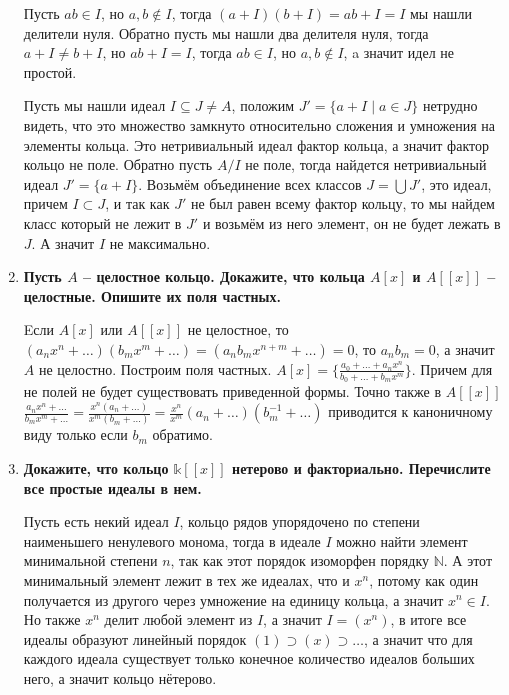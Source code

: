 \documentclass{article}
\begin{document}
\begin{enumerate}
        Пусть $ab\in I$, но $a,b\notin I$, тогда $(a+I)(b+I)=ab+I=I$ мы нашли
        делители нуля. Обратно пусть мы нашли два делителя нуля, тогда $a+I\neq
        b+I$, но $ab+I=I$, тогда $ab\in I$, но $a,b\notin I$, a значит идел не
        простой.

        Пусть мы нашли идеал $I\subseteq J\neq A$, положим $J'=\{a+I\;|\;a\in J\}$
        нетрудно видеть, что это множество замкнуто относительно сложения и
        умножения на элементы кольца. Это нетривиальный идеал фактор кольца, а
        значит фактор кольцо не поле. Обратно пусть $A/I$ не поле, тогда
        найдется нетривиальный идеал $J'=\{a+I\}$. Возьмём объединение всех
        классов $J=\bigcup J'$, это идеал, причем $I\subset J$, и так как $J'$
        не был равен всему фактор кольцу, то мы найдем класс который не лежит в
        $J'$ и возьмём из него элемент, он не будет лежать в $J$. А значит $I$
        не максимально.

    \item \textbf{Пусть $A$ – целостное кольцо. Докажите, что кольца $A[x]$ и
        $A[[x]]$ – целостные. Опишите их поля частных.}

    Eсли $A[x]$ или $A[[x]]$ не целостное, то $(a_nx^{n}+\ldots)(b_mx^{m}+\ldots)
    =(a_nb_mx^{n+m}+\ldots)=0$, то $a_nb_m=0$, а значит $A$ не целостно. Построим
    поля частных. $A[x]=\{\frac{a_0+\ldots+a_nx^n}{b_0+\ldots+b_mx^m}\}$. Причем
    для не полей не будет существовать приведенной формы. Точно также в $A[[x]]$
    $\frac{a_nx^n+\ldots}{b_mx^m+\ldots}=\frac{x^n(a_n+\ldots)}{x^m(b_m+\dots)}=
    \frac{x^n}{x^m}(a_n+\ldots)(b_m^{-1}+\ldots)$ приводится к каноничному виду
    только если $b_m$ обратимо.

    \item \textbf{Докажите, что кольцо $\mathbb{k}[[x]]$ нетерово и факториально.
        Перечислите все простые идеалы в нем.}

        Пусть есть некий идеал $I$, кольцо рядов упорядочено по степени
        наименьшего ненулевого монома, тогда в идеале $I$ можно найти элемент
        минимальной степени $n$, так как этот порядок изоморфен порядку
        $\mathbb{N}$. А этот минимальный элемент лежит в тех же идеалах, что
        и $x^n$, потому как один получается из другого через умножение на единицу
        кольца, а значит $x^n\in I$. Но также $x^n$ делит любой элемент из $I$,
        а значит $I=(x^n)$, в итоге все идеалы образуют линейный порядок
        $(1)\supset (x)\supset\ldots$, а значит что для каждого идеала существует
        только конечное количество идеалов больших него, а значит кольцо нётерово.


\end{enumerate}
\end{document}
